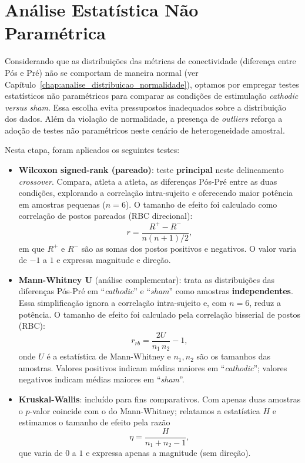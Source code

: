 \chapter{Análise Estatística Não Paramétrica}
\label{chap:analise_estatistica_np}

Considerando que as distribuições das métricas de conectividade (diferença entre Pós e Pré) não se comportam de maneira normal (ver Capítulo~\ref{chap:analise_distribuicao_normalidade}), optamos por empregar testes estatísticos não paramétricos para comparar as condições de estimulação \textit{cathodic} \textit{versus} \textit{sham}. Essa escolha evita pressupostos inadequados sobre a distribuição dos dados. Além da violação de normalidade, a presença de \textit{outliers} reforça a adoção de testes não paramétricos neste cenário de heterogeneidade amostral.

Nesta etapa, foram aplicados os seguintes testes:
\begin{itemize}
  \item \textbf{Wilcoxon signed-rank (pareado)}: teste \textbf{principal} neste delineamento \textit{crossover}. Compara, atleta a atleta, as diferenças Pós-Pré entre as duas condições, explorando a correlação intra-sujeito e oferecendo maior potência em amostras pequenas (\(n=6\)).
        O tamanho de efeito foi calculado como correlação de postos pareados (RBC direcional):
        \[
          r = \frac{R^{+} - R^{-}}{n(n+1)/2},
        \]
        em que \(R^{+}\) e \(R^{-}\) são as somas dos postos positivos e negativos. O valor varia de \(-1\) a \(1\) e expressa magnitude e direção.
  \item \textbf{Mann-Whitney U} (análise complementar): trata as distribuições das diferenças Pós-Pré em ``\textit{cathodic}'' e ``\textit{sham}'' como amostras \textbf{independentes}. Essa simplificação ignora a correlação intra-sujeito e, com \(n=6\), reduz a potência. O tamanho de efeito foi calculado pela correlação bisserial de postos (RBC):
        \[
          r_{rb}= \frac{2U}{n_1\,n_2}-1 ,
        \]
        onde \(U\) é a estatística de Mann-Whitney e \(n_1,n_2\) são os tamanhos das amostras. Valores positivos indicam médias maiores em ``\textit{cathodic}''; valores negativos indicam médias maiores em ``\textit{sham}''.
  \item \textbf{Kruskal-Wallis}: incluído para fins comparativos. Com apenas duas amostras o \(p\)-valor coincide com o do Mann-Whitney; relatamos a estatística \(H\) e estimamos o tamanho de efeito pela razão
        \[
          \eta = \frac{H}{n_1+n_2-1},
        \]
        que varia de \(0\) a \(1\) e expressa apenas a magnitude (sem direção).
\end{itemize}

